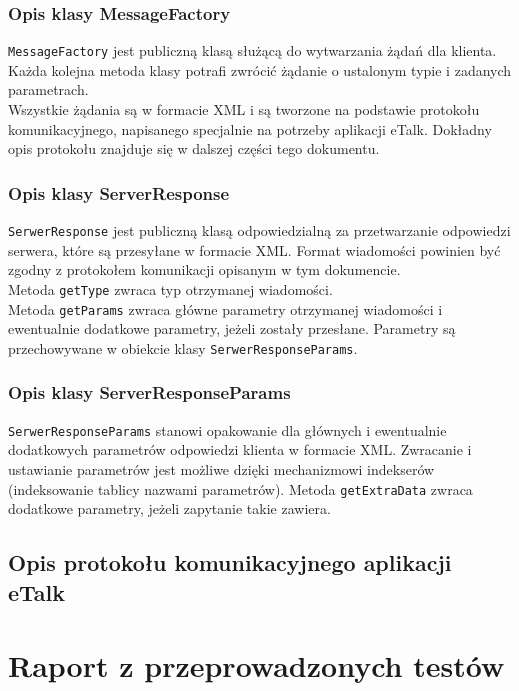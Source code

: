 \documentclass[a4paper,12pt]{article}
\begin{document}
\subsubsection[Opis klasy MessageFactory]{Opis klasy MessageFactory}
\texttt{MessageFactory} jest publiczną klasą służącą do wytwarzania żądań dla klienta.\\
Każda kolejna metoda klasy potrafi zwrócić żądanie o ustalonym typie i zadanych parametrach.\\
Wszystkie żądania są w formacie XML i są tworzone na podstawie protokołu komunikacyjnego, napisanego specjalnie na potrzeby aplikacji eTalk. Dokładny opis protokołu znajduje się w dalszej części tego dokumentu.

\subsubsection[Opis klasy ServerResponse]{Opis klasy ServerResponse}
\texttt{SerwerResponse} jest publiczną klasą odpowiedzialną za przetwarzanie odpowiedzi serwera, które są przesyłane w formacie XML.
Format wiadomości powinien być zgodny z protokołem komunikacji opisanym w tym dokumencie.\\
Metoda \texttt{getType} zwraca typ otrzymanej wiadomości.\\
Metoda \texttt{getParams} zwraca główne parametry otrzymanej wiadomości i ewentualnie dodatkowe parametry, jeżeli zostały przesłane. Parametry są przechowywane w obiekcie klasy \texttt{SerwerResponseParams}.

\subsubsection[Opis klasy ServerResponseParams]{Opis klasy ServerResponseParams}
\texttt{SerwerResponseParams} stanowi opakowanie dla głównych i ewentualnie dodatkowych parametrów odpowiedzi klienta w formacie XML. Zwracanie i ustawianie parametrów jest możliwe dzięki mechanizmowi indekserów (indeksowanie tablicy nazwami parametrów).
Metoda \texttt{getExtraData} zwraca dodatkowe parametry, jeżeli zapytanie takie zawiera.

\subsection[Opis protokołu komunikacyjnego aplikacji eTalk]{Opis protokołu komunikacyjnego aplikacji eTalk}

\section[Raport z przeprowadzonych testów]{Raport z przeprowadzonych testów}
\end{document}
